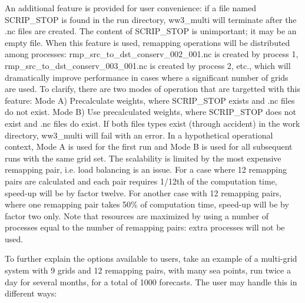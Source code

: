 An additional feature is provided for user convenience: if a file named {\file
  SCRIP\_STOP} is found in the run directory, {\file ww3\_multi} will
terminate after the {\file .nc} files are created. The content of {\file
  SCRIP\_STOP} is unimportant; it may be an empty file. When this feature is
used, remapping operations will be distributed among processes: {\file
  rmp\_src\_to\_dst\_conserv\_002\_001.nc} is created by process 1, {\file
  rmp\_src\_to\_dst\_conserv\_003\_001.nc} is created by process 2, etc.,
which will dramatically improve performance in cases where a significant
number of grids are used. To clarify, there are two modes of operation that are
 targetted with this feature: Mode A) Precalculate weights, where 
{\file SCRIP\_STOP} exists and  {\file .nc} files do not exist. Mode B) Use 
precalculated weights, where {\file SCRIP\_STOP} does not exist and {\file .nc}
 files do exist. If both files types exist (through accident) in the work 
directory, {\file ww3\_multi} will fail with an error. In a hypothetical 
operational context, Mode A is used for the first run and Mode B is used for 
all subsequent runs with the same grid set. The scalability is limited by 
the most expensive remapping pair, i.e. load balancing is an issue. 
For a case where 12 remapping pairs are calculated and each pair requires 
1/12th of the computation time, speed-up will be by factor twelve. For 
another case with 12 remapping pairs, where one remapping pair takes 50\%  
of computation time, speed-up will be by factor two only. Note that resources
are maximized by using a number of processes equal to the number of remapping
pairs: extra processes will not be used. 

To further explain the options available to users, take an example of a 
multi-grid system with 9 grids and 12 remapping pairs, with many sea points, 
run twice a day for several months, for a total of 1000 forecasts. The user 
may handle this in different ways: 

